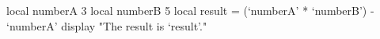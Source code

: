 local numberA 3
local numberB 5
local result = (`numberA' * `numberB') - `numberA'
display "The result is `result'."
